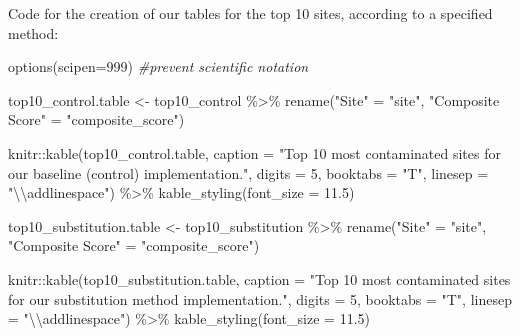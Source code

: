 \documentclass[12pt, twoside]{amherstthesis}
\newenvironment{Shaded}{\begin{snugshade}}{\end{snugshade}}
\newcommand{\AttributeTok}[1]{\textcolor[rgb]{0.77,0.63,0.00}{#1}}
\newcommand{\CommentTok}[1]{\textcolor[rgb]{0.56,0.35,0.01}{\textit{#1}}}
\newcommand{\DecValTok}[1]{\textcolor[rgb]{0.00,0.00,0.81}{#1}}
\newcommand{\FloatTok}[1]{\textcolor[rgb]{0.00,0.00,0.81}{#1}}
\newcommand{\FunctionTok}[1]{\textcolor[rgb]{0.00,0.00,0.00}{#1}}
\newcommand{\NormalTok}[1]{#1}
\newcommand{\OtherTok}[1]{\textcolor[rgb]{0.56,0.35,0.01}{#1}}
\newcommand{\SpecialCharTok}[1]{\textcolor[rgb]{0.00,0.00,0.00}{#1}}
\newcommand{\StringTok}[1]{\textcolor[rgb]{0.31,0.60,0.02}{#1}}
\begin{document}
Code for the creation of our tables for the top 10 sites, according to a specified method:
\begin{Shaded}
\begin{Highlighting}[]
\FunctionTok{options}\NormalTok{(}\AttributeTok{scipen=}\DecValTok{999}\NormalTok{) }\CommentTok{\#prevent scientific notation}

\NormalTok{top10\_control.table }\OtherTok{\textless{}{-}}\NormalTok{ top10\_control }\SpecialCharTok{\%\textgreater{}\%}
  \FunctionTok{rename}\NormalTok{(}\StringTok{"Site"} \OtherTok{=} \StringTok{"site"}\NormalTok{, }
         \StringTok{"Composite Score"} \OtherTok{=} \StringTok{"composite\_score"}\NormalTok{)}

\NormalTok{knitr}\SpecialCharTok{::}\FunctionTok{kable}\NormalTok{(top10\_control.table, }
  \AttributeTok{caption =} \StringTok{"Top 10 most contaminated sites }
\StringTok{  for our baseline (control) implementation."}\NormalTok{, }
             \AttributeTok{digits =} \DecValTok{5}\NormalTok{, }\AttributeTok{booktabs =} \StringTok{"T"}\NormalTok{, }
  \AttributeTok{linesep =} \StringTok{"}\SpecialCharTok{\textbackslash{}\textbackslash{}}\StringTok{addlinespace"}\NormalTok{) }\SpecialCharTok{\%\textgreater{}\%}
  \FunctionTok{kable\_styling}\NormalTok{(}\AttributeTok{font\_size =} \FloatTok{11.5}\NormalTok{) }
\end{Highlighting}
\end{Shaded}
\begin{Shaded}
\begin{Highlighting}[]
\NormalTok{top10\_substitution.table }\OtherTok{\textless{}{-}}\NormalTok{ top10\_substitution }\SpecialCharTok{\%\textgreater{}\%}
  \FunctionTok{rename}\NormalTok{(}\StringTok{"Site"} \OtherTok{=} \StringTok{"site"}\NormalTok{, }
         \StringTok{"Composite Score"} \OtherTok{=} \StringTok{"composite\_score"}\NormalTok{)}

\NormalTok{knitr}\SpecialCharTok{::}\FunctionTok{kable}\NormalTok{(top10\_substitution.table, }
  \AttributeTok{caption =} \StringTok{"Top 10 most contaminated sites }
\StringTok{  for our substitution method implementation."}\NormalTok{, }
             \AttributeTok{digits =} \DecValTok{5}\NormalTok{, }\AttributeTok{booktabs =} \StringTok{"T"}\NormalTok{, }
  \AttributeTok{linesep =} \StringTok{"}\SpecialCharTok{\textbackslash{}\textbackslash{}}\StringTok{addlinespace"}\NormalTok{) }\SpecialCharTok{\%\textgreater{}\%}
  \FunctionTok{kable\_styling}\NormalTok{(}\AttributeTok{font\_size =} \FloatTok{11.5}\NormalTok{) }
\end{Highlighting}
\end{Shaded}
\end{document}
